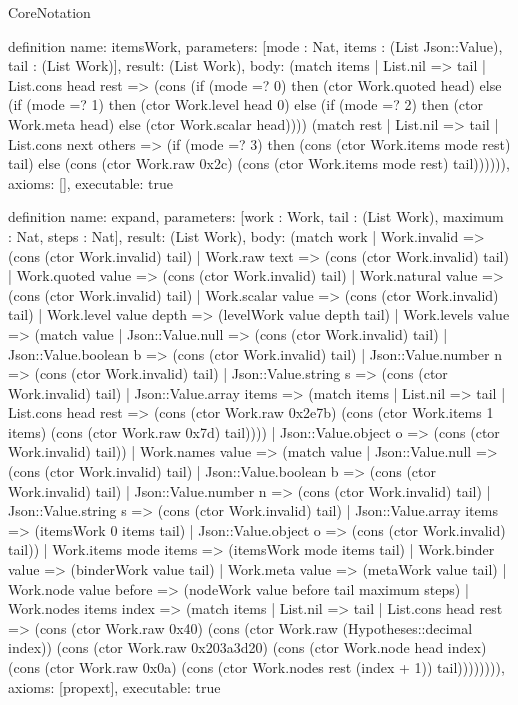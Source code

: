 \begin{lexlean}{CoreNotation}
\begin{semanticmodule}
definition{
 name: itemsWork,
 parameters: [mode : Nat, items : (List Json::Value), tail : (List Work)],
 result: (List Work),
 body: (match items | List.nil => tail | List.cons head rest => (cons (if (mode =? 0) then (ctor Work.quoted head) else (if (mode =? 1) then (ctor Work.level head 0) else (if (mode =? 2) then (ctor Work.meta head) else (ctor Work.scalar head)))) (match rest | List.nil => tail | List.cons next others => (if (mode =? 3) then (cons (ctor Work.items mode rest) tail) else (cons (ctor Work.raw 0x2c) (cons (ctor Work.items mode rest) tail)))))),
 axioms: [],
 executable: true
}

definition{
 name: expand,
 parameters: [work : Work, tail : (List Work), maximum : Nat, steps : Nat],
 result: (List Work),
 body: (match work | Work.invalid => (cons (ctor Work.invalid) tail) | Work.raw text => (cons (ctor Work.invalid) tail) | Work.quoted value => (cons (ctor Work.invalid) tail) | Work.natural value => (cons (ctor Work.invalid) tail) | Work.scalar value => (cons (ctor Work.invalid) tail) | Work.level value depth => (levelWork value depth tail) | Work.levels value => (match value | Json::Value.null => (cons (ctor Work.invalid) tail) | Json::Value.boolean b => (cons (ctor Work.invalid) tail) | Json::Value.number n => (cons (ctor Work.invalid) tail) | Json::Value.string s => (cons (ctor Work.invalid) tail) | Json::Value.array items => (match items | List.nil => tail | List.cons head rest => (cons (ctor Work.raw 0x2e7b) (cons (ctor Work.items 1 items) (cons (ctor Work.raw 0x7d) tail)))) | Json::Value.object o => (cons (ctor Work.invalid) tail)) | Work.names value => (match value | Json::Value.null => (cons (ctor Work.invalid) tail) | Json::Value.boolean b => (cons (ctor Work.invalid) tail) | Json::Value.number n => (cons (ctor Work.invalid) tail) | Json::Value.string s => (cons (ctor Work.invalid) tail) | Json::Value.array items => (itemsWork 0 items tail) | Json::Value.object o => (cons (ctor Work.invalid) tail)) | Work.items mode items => (itemsWork mode items tail) | Work.binder value => (binderWork value tail) | Work.meta value => (metaWork value tail) | Work.node value before => (nodeWork value before tail maximum steps) | Work.nodes items index => (match items | List.nil => tail | List.cons head rest => (cons (ctor Work.raw 0x40) (cons (ctor Work.raw (Hypotheses::decimal index)) (cons (ctor Work.raw 0x203a3d20) (cons (ctor Work.node head index) (cons (ctor Work.raw 0x0a) (cons (ctor Work.nodes rest (index + 1)) tail)))))))),
 axioms: [propext],
 executable: true
}


\end{semanticmodule}
\end{lexlean}
